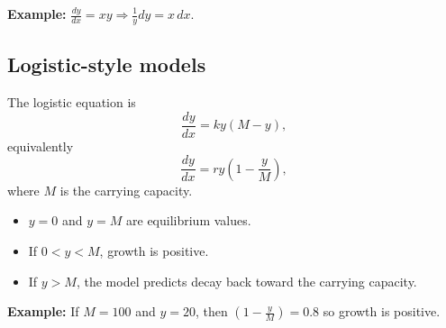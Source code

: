 \textbf{Example:} $\frac{dy}{dx}=xy \Rightarrow \frac{1}{y}dy=x\,dx$.

\subsection{Logistic-style models}
The logistic equation is
\[
\frac{dy}{dx} = ky(M-y),
\]
equivalently
\[
\frac{dy}{dx} = ry\left(1-\frac{y}{M}\right),
\]
where $M$ is the carrying capacity.

\begin{itemize}[leftmargin=*]
  \item $y=0$ and $y=M$ are equilibrium values.
  \item If $0<y<M$, growth is positive.
  \item If $y>M$, the model predicts decay back toward the carrying capacity.
\end{itemize}

\textbf{Example:} If $M=100$ and $y=20$, then $\left(1-\frac{y}{M}\right)=0.8$ so growth is positive.

